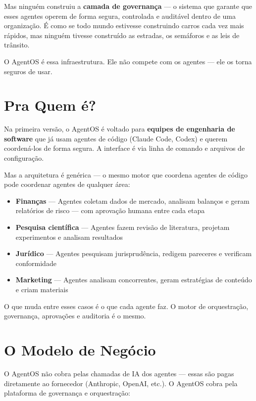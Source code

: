 \documentclass[12pt, a4paper]{article}
\begin{document}
Mas ninguém construiu a \textbf{camada de governança} --- o sistema que garante que esses agentes operem de forma segura, controlada e auditável dentro de uma organização. É como se todo mundo estivesse construindo carros cada vez mais rápidos, mas ninguém tivesse construído as estradas, os semáforos e as leis de trânsito.

O AgentOS é essa infraestrutura. Ele não compete com os agentes --- ele os torna seguros de usar.

\section{Pra Quem é?}

Na primeira versão, o AgentOS é voltado para \textbf{equipes de engenharia de software} que já usam agentes de código (Claude Code, Codex) e querem coordená-los de forma segura. A interface é via linha de comando e arquivos de configuração.

Mas a arquitetura é genérica --- o mesmo motor que coordena agentes de código pode coordenar agentes de qualquer área:

\begin{itemize}[leftmargin=1.5em]
    \item \textbf{Finanças} --- Agentes coletam dados de mercado, analisam balanços e geram relatórios de risco --- com aprovação humana entre cada etapa
    \item \textbf{Pesquisa científica} --- Agentes fazem revisão de literatura, projetam experimentos e analisam resultados
    \item \textbf{Jurídico} --- Agentes pesquisam jurisprudência, redigem pareceres e verificam conformidade
    \item \textbf{Marketing} --- Agentes analisam concorrentes, geram estratégias de conteúdo e criam materiais
\end{itemize}

O que muda entre esses casos é o que cada agente faz. O motor de orquestração, governança, aprovações e auditoria é o mesmo.

\section{O Modelo de Negócio}

O AgentOS não cobra pelas chamadas de IA dos agentes --- essas são pagas diretamente ao fornecedor (Anthropic, OpenAI, etc.). O AgentOS cobra pela plataforma de governança e orquestração:
\end{document}
